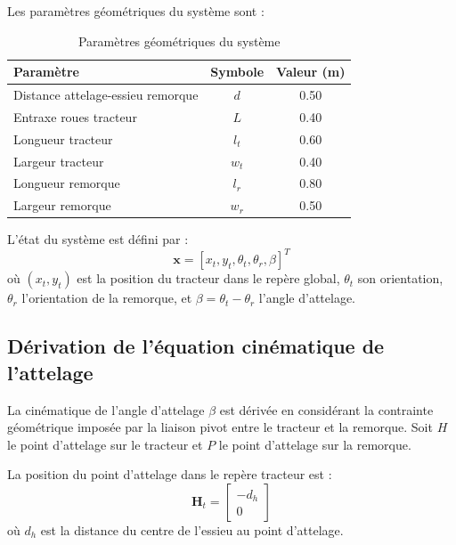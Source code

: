 \documentclass[a4paper,12pt]{report}
\begin{document}
Les paramètres géométriques du système sont :

\begin{table}[htbp]
    \centering
    \begin{tabular}{lcc}
        \toprule
        Paramètre & Symbole & Valeur (m) \\
        \midrule
        Distance attelage-essieu remorque & $d$ & 0.50 \\
        Entraxe roues tracteur & $L$ & 0.40 \\
        Longueur tracteur & $l_t$ & 0.60 \\
        Largeur tracteur & $w_t$ & 0.40 \\
        Longueur remorque & $l_r$ & 0.80 \\
        Largeur remorque & $w_r$ & 0.50 \\
        \bottomrule
    \end{tabular}
    \caption{Paramètres géométriques du système}
    \label{tab:parametres_geometriques}
\end{table}

L'état du système est défini par :
\begin{equation}
    \mathbf{x} = [x_t, y_t, \theta_t, \theta_r, \beta]^T
    \label{eq:etat_systeme}
\end{equation}
où $(x_t, y_t)$ est la position du tracteur dans le repère global, $\theta_t$ son orientation, $\theta_r$ l'orientation de la remorque, et $\beta = \theta_t - \theta_r$ l'angle d'attelage.

\subsection{Dérivation de l'équation cinématique de l'attelage}
\label{subsec:derivation_beta}

La cinématique de l'angle d'attelage $\beta$ est dérivée en considérant la contrainte géométrique imposée par la liaison pivot entre le tracteur et la remorque. Soit $H$ le point d'attelage sur le tracteur et $P$ le point d'attelage sur la remorque.

La position du point d'attelage dans le repère tracteur est :
\begin{equation}
    \mathbf{H}_t = \begin{bmatrix} -d_h \\ 0 \end{bmatrix}
    \label{eq:position_attelage_tracteur}
\end{equation}
où $d_h$ est la distance du centre de l'essieu au point d'attelage.
\end{document}
